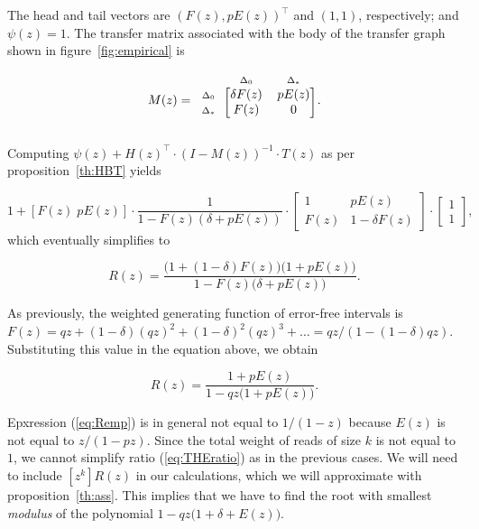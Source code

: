 \documentclass{article}
\newcommand{\smDELz}{\scriptstyle{\Delta_0}}
\newcommand{\smDELs}{\scriptstyle{\Delta_*}}
\begin{document}
The head and tail vectors are $(F(z), pE(z))^\top$ and $(1,1)$,
respectively; and $\psi(z) = 1$. The transfer matrix associated with the
body of the transfer graph shown in figure~\ref{fig:empirical} is

\begin{equation*}
M(z) = 
\begin{blockarray}{ccc}
       & \smDELz & \smDELs \\
\begin{block}{c[cc]}
\smDELz & \delta F(z)  & p E(z) \\
\smDELs & F(z)         &   0    \\
\end{block}
\end{blockarray}.
\end{equation*}


Computing $\psi(z) + H(z)^\top \cdot (I-M(z))^{-1} \cdot T(z)$ as per
proposition~\ref{th:HBT} yields

\begin{equation*}
1+[F(z) \; pE(z)] \cdot \frac{1}{1-F(z)(\delta+pE(z))} \cdot
\begin{bmatrix}
1    & pE(z) \\
F(z) & 1-\delta F(z)
\end{bmatrix} \cdot
\begin{bmatrix}1 \\ 1\end{bmatrix},
\end{equation*}
which eventually simplifies to

\begin{equation}
\label{eq:Remp0}
R(z) = 
\frac{\big(1+(1-\delta)F(z)\big)\big(1+pE(z)\big)}
   {1-F(z)\big(\delta+pE(z)\big)}.
\end{equation}

As previously, the weighted generating function of error-free intervals is
$F(z) = qz + (1-\delta)(qz)^2 + (1-\delta)^2(qz)^3 + \ldots =
qz/(1-(1-\delta)qz)$. Substituting this value in the equation above, we
obtain

\begin{equation}
\label{eq:Remp}
R(z) = \frac{1+pE(z)}{1-qz\big(1+pE(z)\big)}.
\end{equation}

Epxression (\ref{eq:Remp}) is in general not equal to $1/(1-z)$ because
$E(z)$ is not equal to $z/(1-pz)$. Since the total weight of reads of size
$k$ is not equal to $1$, we cannot simplify ratio (\ref{eq:THEratio}) as
in the previous cases. We will need to include $[z^k]R(z)$ in our
calculations, which we will approximate with proposition~\ref{th:ass}.
This implies that we have to find the root with smallest \textit{modulus}
of the polynomial $1-qz\big(1+\delta+E(z)\big)$.
\end{document}
